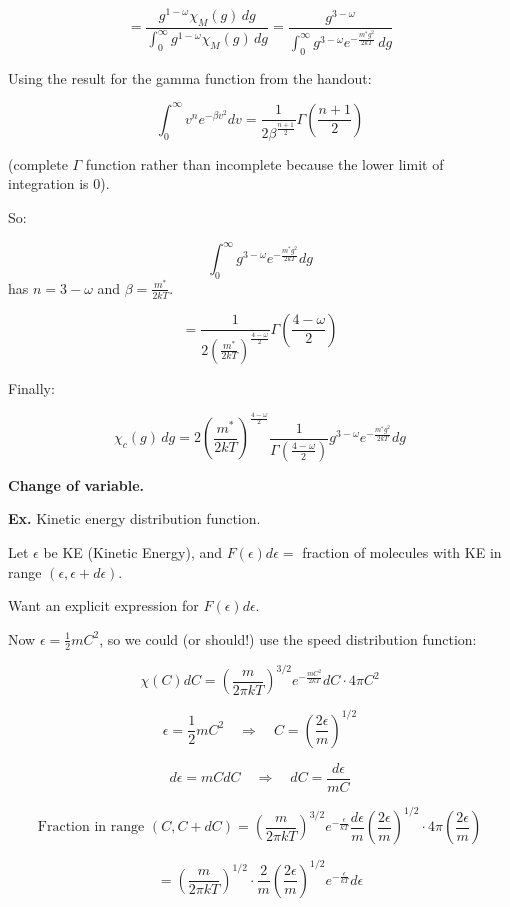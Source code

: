 \documentclass{article}
\begin{document}
\[
= \frac{g^{1-\omega} \chi_M(g) \, dg}{\int_0^{\infty} g^{1-\omega} \chi_M(g) \, dg}
= \frac{g^{3-\omega}}{\int_0^{\infty} g^{3-\omega} e^{-\frac{m^* g^2}{2 k T}} \, dg}
\]

Using the result for the gamma function from the handout:

\[
\int_0^\infty v^n e^{-\beta v^2} dv = \frac{1}{2 \beta^{\frac{n+1}{2}}} \Gamma\left(\frac{n+1}{2}\right)
\]

(complete \( \Gamma \) function rather than incomplete because the lower limit of integration is 0).

So:

\[
\int_0^\infty g^{3-\omega} e^{-\frac{m^* g^2}{2kT}} dg
\]
has \( n = 3 - \omega \) and \( \beta = \frac{m^*}{2 k T} \).

\[
= \frac{1}{2 \left(\frac{m^*}{2 k T}\right)^{\frac{4 - \omega}{2}}} \Gamma\left(\frac{4 - \omega}{2}\right)
\]

Finally:

\[
\chi_c(g) \, dg = 2 \left(\frac{m^*}{2 k T}\right)^{\frac{4 - \omega}{2}} \frac{1}{\Gamma\left(\frac{4 - \omega}{2}\right)} g^{3 - \omega} e^{-\frac{m^* g^2}{2 k T}} dg
\]

\newpage
\textbf{Change of variable.}

\textbf{Ex.} Kinetic energy distribution function.

Let \(\epsilon\) be KE (Kinetic Energy), and \(F(\epsilon) d\epsilon =\) fraction of molecules with KE in range \((\epsilon, \epsilon + d\epsilon)\).

Want an explicit expression for \(F(\epsilon) d\epsilon\).

Now \(\epsilon = \frac{1}{2} m C^2\), so we could (or should!) use the speed distribution function:

\[
\chi(C) dC = \left( \frac{m}{2 \pi k T} \right)^{3/2} e^{-\frac{m C^2}{2 k T}} dC \cdot 4 \pi C^2
\]

\[
\epsilon = \frac{1}{2} m C^2 \quad \Rightarrow \quad C = \left( \frac{2 \epsilon}{m} \right)^{1/2}
\]

\[
d\epsilon = m C dC
\quad \Rightarrow \quad
dC = \frac{d\epsilon}{m C}
\]

\[
\text{Fraction in range } (C, C + dC) = \left( \frac{m}{2\pi kT} \right)^{3/2} e^{-\frac{\epsilon}{kT}} \frac{d\epsilon}{m} \left( \frac{2\epsilon}{m} \right)^{1/2} \cdot 4\pi \left( \frac{2\epsilon}{m} \right)
\]

\[
= \left( \frac{m}{2\pi kT} \right)^{1/2} \cdot \frac{2}{m} \left( \frac{2\epsilon}{m} \right)^{1/2} e^{-\frac{\epsilon}{kT}} d\epsilon
\]
\end{document}
